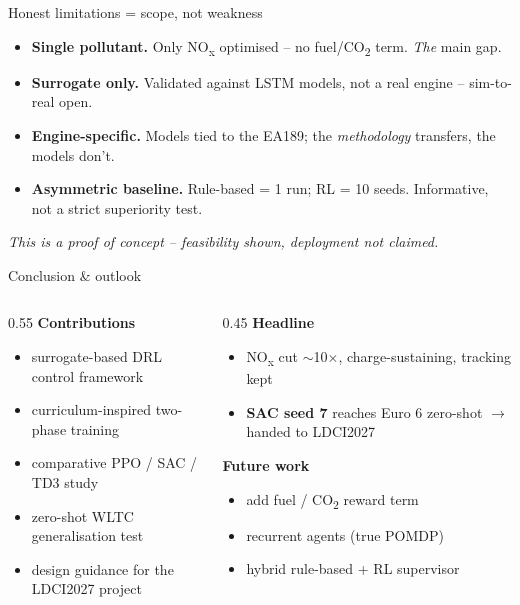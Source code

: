 \documentclass[aspectratio=169,11pt]{beamer}
\newcommand{\NOx}{NO\textsubscript{x}}
\newcommand{\keyword}[1]{\textcolor{tugreen}{\textbf{#1}}}
\newcommand{\honest}[1]{\textcolor{tuaccent}{\textbf{#1}}}
\begin{document}
\begin{frame}{Honest limitations = scope, not weakness}
  \begin{itemize}
    \item \honest{Single pollutant.} Only \NOx{} optimised -- no fuel/CO\textsubscript{2} term. \emph{The} main gap.
    \item \honest{Surrogate only.} Validated against LSTM models, not a real engine -- sim-to-real open.
    \item \honest{Engine-specific.} Models tied to the EA189; the \emph{methodology} transfers, the models don't.
    \item \honest{Asymmetric baseline.} Rule-based = 1 run; RL = 10 seeds. Informative, not a strict superiority test.
  \end{itemize}
  \vspace{0.5em}
  \begin{center}
    \emph{This is a proof of concept -- feasibility shown, deployment not claimed.}
  \end{center}
\end{frame}

\begin{frame}{Conclusion \& outlook}
  \begin{columns}[T]
    \begin{column}{0.55\textwidth}
      \textbf{Contributions}
      \begin{itemize}\footnotesize
        \item surrogate-based DRL control framework
        \item curriculum-inspired two-phase training
        \item comparative PPO / SAC / TD3 study
        \item zero-shot WLTC generalisation test
        \item design guidance for the LDCI2027 project
      \end{itemize}
    \end{column}
    \begin{column}{0.45\textwidth}
      \textbf{Headline}
      \begin{itemize}\footnotesize
        \item \NOx{} cut $\sim$10$\times$, charge-sustaining, tracking kept
        \item \keyword{SAC seed 7} reaches Euro 6 zero-shot $\to$ handed to LDCI2027
      \end{itemize}
      \textbf{Future work}
      \begin{itemize}\footnotesize
        \item add fuel / CO\textsubscript{2} reward term
        \item recurrent agents (true POMDP)
        \item hybrid rule-based + RL supervisor
      \end{itemize}
    \end{column}
  \end{columns}
\end{frame}
\end{document}
